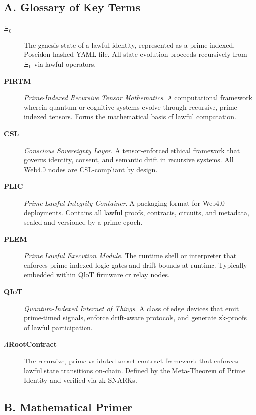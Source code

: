 \documentclass[12]{amsart}
\theoremstyle{plain}
\begin{document}
\subsection*{A. Glossary of Key Terms}
\begin{description}
  \item[\textbf{$\Xi_0$}] The genesis state of a lawful identity, represented as a prime-indexed, Poseidon-hashed YAML file. All state evolution proceeds recursively from $\Xi_0$ via lawful operators.

  \item[\textbf{PIRTM}] \textit{Prime-Indexed Recursive Tensor Mathematics}. A computational framework wherein quantum or cognitive systems evolve through recursive, prime-indexed tensors. Forms the mathematical basis of lawful computation.

  \item[\textbf{CSL}] \textit{Conscious Sovereignty Layer}. A tensor-enforced ethical framework that governs identity, consent, and semantic drift in recursive systems. All Web4.0 nodes are CSL-compliant by design.

  \item[\textbf{PLIC}] \textit{Prime Lawful Integrity Container}. A packaging format for Web4.0 deployments. Contains all lawful proofs, contracts, circuits, and metadata, sealed and versioned by a prime-epoch.

  \item[\textbf{PLEM}] \textit{Prime Lawful Execution Module}. The runtime shell or interpreter that enforces prime-indexed logic gates and drift bounds at runtime. Typically embedded within QIoT firmware or relay nodes.

  \item[\textbf{QIoT}] \textit{Quantum-Indexed Internet of Things}. A class of edge devices that emit prime-timed signals, enforce drift-aware protocols, and generate zk-proofs of lawful participation.

  \item[\textbf{$\Lambda$RootContract}] The recursive, prime-validated smart contract framework that enforces lawful state transitions on-chain. Defined by the Meta-Theorem of Prime Identity and verified via zk-SNARKs.
\end{description}

\subsection*{B. Mathematical Primer}
\label{appendix:math_primer}
\end{document}
